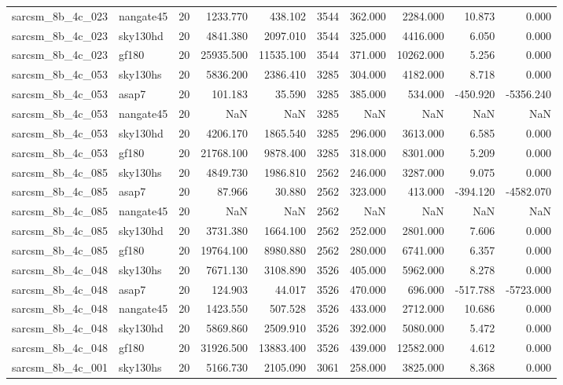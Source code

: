 \begin{longtable}{llrrrrrrrr}
sarcsm\_8b\_4c\_023 & nangate45 & 20 & 1233.770 & 438.102 & 3544 & 362.000 & 2284.000 & 10.873 & 0.000 \\
sarcsm\_8b\_4c\_023 & sky130hd & 20 & 4841.380 & 2097.010 & 3544 & 325.000 & 4416.000 & 6.050 & 0.000 \\
sarcsm\_8b\_4c\_023 & gf180 & 20 & 25935.500 & 11535.100 & 3544 & 371.000 & 10262.000 & 5.256 & 0.000 \\
sarcsm\_8b\_4c\_053 & sky130hs & 20 & 5836.200 & 2386.410 & 3285 & 304.000 & 4182.000 & 8.718 & 0.000 \\
sarcsm\_8b\_4c\_053 & asap7 & 20 & 101.183 & 35.590 & 3285 & 385.000 & 534.000 & -450.920 & -5356.240 \\
sarcsm\_8b\_4c\_053 & nangate45 & 20 & NaN & NaN & 3285 & NaN & NaN & NaN & NaN \\
sarcsm\_8b\_4c\_053 & sky130hd & 20 & 4206.170 & 1865.540 & 3285 & 296.000 & 3613.000 & 6.585 & 0.000 \\
sarcsm\_8b\_4c\_053 & gf180 & 20 & 21768.100 & 9878.400 & 3285 & 318.000 & 8301.000 & 5.209 & 0.000 \\
sarcsm\_8b\_4c\_085 & sky130hs & 20 & 4849.730 & 1986.810 & 2562 & 246.000 & 3287.000 & 9.075 & 0.000 \\
sarcsm\_8b\_4c\_085 & asap7 & 20 & 87.966 & 30.880 & 2562 & 323.000 & 413.000 & -394.120 & -4582.070 \\
sarcsm\_8b\_4c\_085 & nangate45 & 20 & NaN & NaN & 2562 & NaN & NaN & NaN & NaN \\
sarcsm\_8b\_4c\_085 & sky130hd & 20 & 3731.380 & 1664.100 & 2562 & 252.000 & 2801.000 & 7.606 & 0.000 \\
sarcsm\_8b\_4c\_085 & gf180 & 20 & 19764.100 & 8980.880 & 2562 & 280.000 & 6741.000 & 6.357 & 0.000 \\
sarcsm\_8b\_4c\_048 & sky130hs & 20 & 7671.130 & 3108.890 & 3526 & 405.000 & 5962.000 & 8.278 & 0.000 \\
sarcsm\_8b\_4c\_048 & asap7 & 20 & 124.903 & 44.017 & 3526 & 470.000 & 696.000 & -517.788 & -5723.000 \\
sarcsm\_8b\_4c\_048 & nangate45 & 20 & 1423.550 & 507.528 & 3526 & 433.000 & 2712.000 & 10.686 & 0.000 \\
sarcsm\_8b\_4c\_048 & sky130hd & 20 & 5869.860 & 2509.910 & 3526 & 392.000 & 5080.000 & 5.472 & 0.000 \\
sarcsm\_8b\_4c\_048 & gf180 & 20 & 31926.500 & 13883.400 & 3526 & 439.000 & 12582.000 & 4.612 & 0.000 \\
sarcsm\_8b\_4c\_001 & sky130hs & 20 & 5166.730 & 2105.090 & 3061 & 258.000 & 3825.000 & 8.368 & 0.000 \\

\end{longtable}
